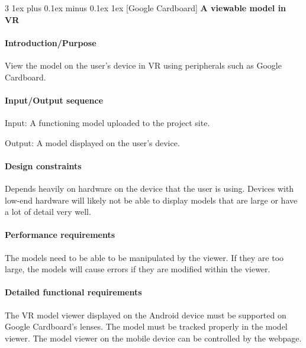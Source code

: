 \documentclass[letterpaper, 10pt, draftclsnofoot, compsoc, onecolumn]{IEEEtran}
\makeatletter
\def\subsubsection{\@startsection{subsubsection}%
                                 {3}%
                                 {\z@}%
                                 {1ex plus 0.1ex minus 0.1ex}%
                                 {1ex}%
                                 {\normalfont\normalsize}}%
\makeatother
\begin{document}

\subsubsection[{Google Cardboard}]{\rmfamily\bfseries\color{black} 
	A viewable model in VR 
}

\paragraph[Introduction/Purpose of this
feature]{\rmfamily\bfseries\color{black}
Introduction/Purpose }
	View the model on the user's device in VR using peripherals such as Google Cardboard.   

\paragraph[Input/Output sequence]{\rmfamily\bfseries\color{black}
Input/Output sequence }
	Input: A functioning model uploaded to the project site.
	
	Output: A model displayed on the user's device.

\paragraph[Design constraints]{\rmfamily\bfseries\color{black} Design
constraints }
	Depends heavily on hardware on the device that the user is using. Devices with low-end hardware will likely not be able to 
	display models that are large or have a lot of detail very well.  

\paragraph[Performance requirements]{\rmfamily\bfseries\color{black}
Performance requirements }
	The models need to be able to be manipulated by the viewer. If they are too large, the models will cause errors if they are 
	modified within the viewer.  

\paragraph[Detailed functional requirements]{\rmfamily\bfseries\color{black}
Detailed functional requirements }
	The VR model viewer displayed on the Android device must be supported on Google Cardboard's lenses. The model must 
	be tracked properly in the model viewer. The model viewer on the mobile device can be controlled by the webpage.  
\end{document}
